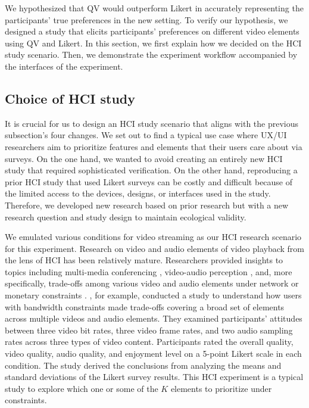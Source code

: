 We hypothesized that QV would outperform Likert in accurately representing the participants' true preferences in the new setting. To verify our hypothesis, we designed a study that elicits participants' preferences on different video elements using QV and Likert. In this section, we first explain how we decided on the HCI study scenario. Then, we demonstrate the experiment workflow accompanied by the interfaces of the experiment.

 
\subsection{Choice of HCI study}
It is crucial for us to design an HCI study scenario that aligns with the previous subsection's four changes. We set out to find a typical use case where UX/UI researchers aim to prioritize features and elements that their users care about via surveys. On the one hand, we wanted to avoid creating an entirely new HCI study that required sophisticated verification. On the other hand, reproducing a prior HCI study that used Likert surveys can be costly and difficult because of the limited access to the devices, designs, or interfaces used in the study. Therefore, we developed new research based on prior research but with a new research question and study design to maintain ecological validity.

We emulated various conditions for video streaming as our HCI research scenario for this experiment. Research on video and audio elements of video playback from the lens of HCI has been relatively mature. Researchers provided insights to topics including multi-media conferencing \cite{watson1996evaluating}, video-audio perception \cite{chen2006cognitive, molnar2015assessing}, and, more specifically, trade-offs among various video and audio elements under network or monetary constraints \cite{molnar2013comedy, oeldorf2012bad}. \textcite{oeldorf2012bad}, for example, conducted a study to understand how users with bandwidth constraints made trade-offs covering a broad set of elements across multiple videos and audio elements. They examined participants' attitudes between three video bit rates, three video frame rates, and two audio sampling rates across three types of video content. Participants rated the overall quality, video quality, audio quality, and enjoyment level on a 5-point Likert scale in each condition. The study derived the conclusions from analyzing the means and standard deviations of the Likert survey results. This HCI experiment is a typical study to explore which one or some of the $K$ elements to prioritize under constraints.


